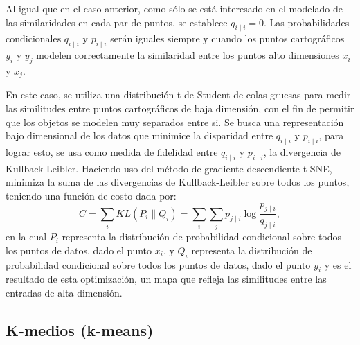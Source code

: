 \documentclass[12pt,letterpaper,oneside,openright]{book}
\begin{document}
	Al igual que en el caso anterior, como sólo se está interesado en el modelado de las similaridades en cada par de puntos, se establece $q_{i \mid i}=0$.
	Las probabilidades condicionales $q_{i \mid i}$ y $p_{i \mid i}$ serán iguales siempre y cuando los puntos cartográficos $y_i$ y $y_j$ modelen correctamente la similaridad entre los puntos alto dimensiones $x_i$ y $x_j$.
	
	En este caso, se utiliza una distribución t de Student de colas gruesas para medir las similitudes entre puntos cartográficos de baja dimensión, con el fin de permitir que los objetos se modelen muy separados entre si. 
	Se busca una representación bajo dimensional de los datos que minimice la disparidad entre $q_{i \mid i}$ y $p_{i \mid i}$, para lograr esto, se usa como medida de fidelidad entre $q_{i \mid i}$ y $p_{i \mid i}$, la divergencia de Kullback-Leibler. Haciendo uso del método de gradiente descendiente t-SNE, minimiza la suma de las divergencias de Kullback-Leibler sobre todos los puntos, teniendo una función de costo dada por: 
	\begin{equation}
		\label{eq:func_costo}
		C = \sum_i KL(P_i\|Q_i)=\sum_i\sum_j p_{j\mid i}\log\frac{p_{j\mid i}}{q_{j\mid i}},
	\end{equation}
	en la cual $P_i$ representa la distribución de probabilidad condicional sobre todos los puntos de datos, dado el punto $x_i$, y $Q_i$ representa la distribución de probabilidad condicional sobre todos los puntos de datos, dado el punto $y_i$ y es el resultado de esta optimización, un mapa que refleja las similitudes entre las entradas de alta dimensión.
	
\subsection{K-medios (k-means)}
\end{document}
